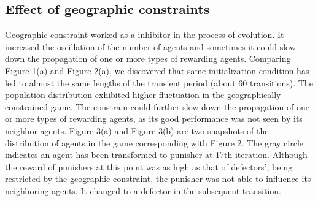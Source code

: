 \documentclass[11pt]{article}
\begin{document}
\subsection{Effect of geographic constraints}
Geographic constraint worked as a inhibitor in the process of evolution. It increased the oscillation of the number of agents and sometimes it could slow down the propagation of one or more types of rewarding agents. Comparing Figure 1(a) and Figure 2(a), we discovered that same initialization condition has led to almost the same lengths of the transient period (about 60 transitions). The population distribution exhibited higher fluctuation in the geographically constrained game. The constrain could further slow down the propagation of one or more types of rewarding agents, as its good performance was not seen by its neighbor agents. Figure 3(a) and Figure 3(b) are two snapshots of the distribution of agents in the game corresponding with Figure 2. The gray circle indicates an agent has been transformed to punisher at 17th iteration. Although the reward of punishers at this point was as high as that of defectors', being restricted by the geographic constraint, the punisher was not able to influence its neighboring agents. It changed to a defector in the subsequent transition.
\end{document}
